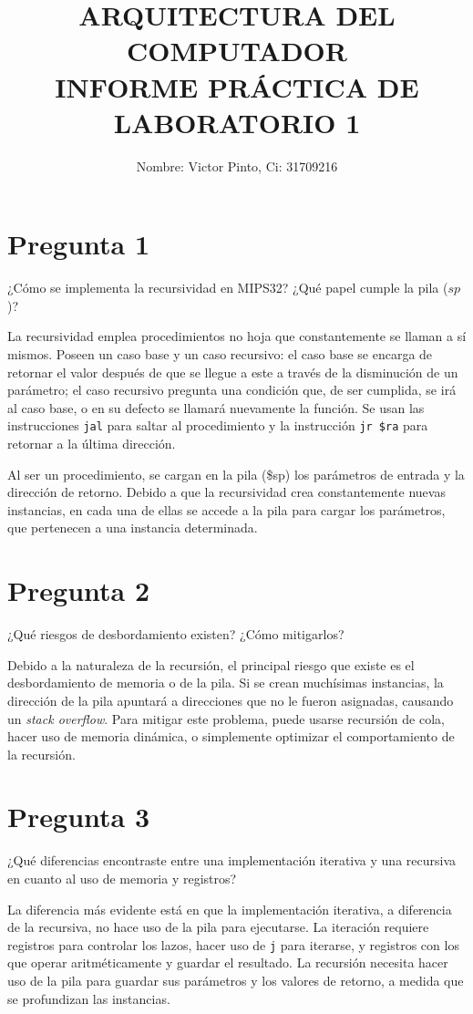 \documentclass[12pt]{article}
\title{ARQUITECTURA DEL COMPUTADOR \\ INFORME PRÁCTICA DE LABORATORIO 1}
\author{Nombre: Victor Pinto, Ci: 31709216\underline{}}
\date{}
\begin{document}
\maketitle

\section*{Pregunta 1}
¿Cómo se implementa la recursividad en MIPS32? ¿Qué papel cumple la pila ($sp$)?

La recursividad emplea procedimientos no hoja que constantemente se llaman a sí mismos. Poseen un caso base y un caso recursivo: el caso base se encarga de retornar el valor después de que se llegue a este a través de la disminución de un parámetro; el caso recursivo pregunta una condición que, de ser cumplida, se irá al caso base, o en su defecto se llamará nuevamente la función. Se usan las instrucciones \texttt{jal} para saltar al procedimiento y la instrucción \texttt{jr \$ra} para retornar a la última dirección.

Al ser un procedimiento, se cargan en la pila (\$sp) los parámetros de entrada y la dirección de retorno. Debido a que la recursividad crea constantemente nuevas instancias, en cada una de ellas se accede a la pila para cargar los parámetros, que pertenecen a una instancia determinada.

\section*{Pregunta 2}
¿Qué riesgos de desbordamiento existen? ¿Cómo mitigarlos?

Debido a la naturaleza de la recursión, el principal riesgo que existe es el desbordamiento de memoria o de la pila. Si se crean muchísimas instancias, la dirección de la pila apuntará a direcciones que no le fueron asignadas, causando un \textit{stack overflow}. Para mitigar este problema, puede usarse recursión de cola, hacer uso de memoria dinámica, o simplemente optimizar el comportamiento de la recursión.

\section*{Pregunta 3}
¿Qué diferencias encontraste entre una implementación iterativa y una recursiva en cuanto al uso de memoria y registros?

La diferencia más evidente está en que la implementación iterativa, a diferencia de la recursiva, no hace uso de la pila para ejecutarse. La iteración requiere registros para controlar los lazos, hacer uso de \texttt{j} para iterarse, y registros con los que operar aritméticamente y guardar el resultado. La recursión necesita hacer uso de la pila para guardar sus parámetros y los valores de retorno, a medida que se profundizan las instancias.
\end{document}

